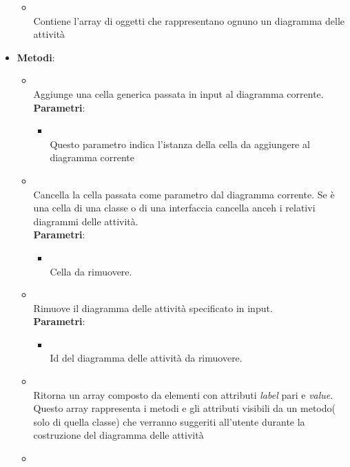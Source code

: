 \begin{itemize}
\begin{itemize}
\item {}
\\ Contiene l'array  di oggetti che rappresentano ognuno un diagramma delle attività
\end{itemize}
\item \textbf{Metodi}:
\begin{itemize}
\item {}
\\ Aggiunge una cella generica passata in input al diagramma corrente.
\\ \textbf{Parametri}:
\begin{itemize}
\item {}
\\ Questo parametro indica l'istanza della cella da aggiungere al diagramma corrente
\end{itemize}
\item {}
\\ Cancella la cella passata come parametro dal diagramma corrente. Se è una cella di una classe o di una interfaccia cancella anceh i relativi diagrammi delle attività.
\\ \textbf{Parametri}:
\begin{itemize}
\item {}
\\ Cella da rimuovere.
\end{itemize}
\item {}
\\ Rimuove il diagramma delle attività specificato in input.
\\ \textbf{Parametri}:
\begin{itemize}
\item {}
\\ Id del diagramma delle attività da rimuovere.
\end{itemize}
\item {}
\\ Ritorna un array composto da elementi con attributi \emph{label} pari e \emph{value}. Questo array rappresenta i metodi e gli attributi visibili da un metodo( solo di quella classe) che verranno suggeriti all'utente durante la costruzione del diagramma delle attività
\item {}

\end{itemize}
\end{itemize}
